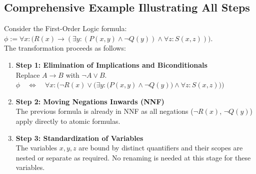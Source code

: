\subsection{Comprehensive Example Illustrating All Steps}
Consider the First-Order Logic formula:
\\[0.2cm]
\hspace*{1.3cm}
$\phi := \forall x: \bigl(R(x) \rightarrow (\exists y: (P(x,y) \land \neg Q(y)) \land \forall z: S(x,z)))$.
\\[0.2cm]
The transformation proceeds as follows:
\begin{enumerate}
\item \textbf{Step 1: Elimination of Implications and Biconditionals} \\
      Replace $A \rightarrow B$ with $\neg A \lor B$. 
      \\[0.2cm]
      \hspace*{1.3cm}
      $\phi \quad\Leftrightarrow\quad \forall x: \bigl(\neg R(x) \lor \bigl(\exists y: (P(x,y) \land \neg
      Q(y)\bigr) \land \forall z: S(x,z)\bigr)\bigr)$ 
\item \textbf{Step 2: Moving Negations Inwards (NNF)} \\
      The previous formula is already in NNF as all negations ($\neg R(x)$, $\neg Q(y)$) apply directly to atomic formulas.

\item \textbf{Step 3: Standardization of Variables} \\
    The variables $x, y, z$ are bound by distinct quantifiers and their scopes are nested or separate as required. No renaming is needed at this stage for these variables.


\end{enumerate}
